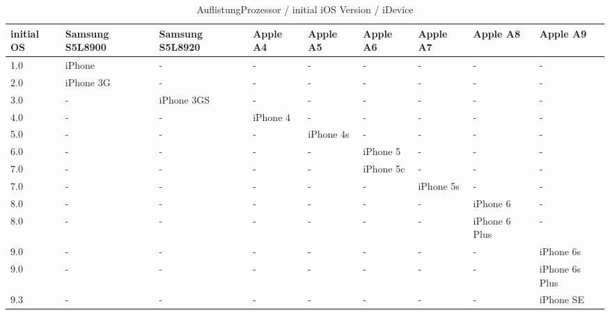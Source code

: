 \begin{table}[htp!]
    \begin{center}
        \begin{tabular}{| p{8mm} | p{18mm} | p{18mm} | p{15mm} | p{15mm} | p{15mm} | p{15mm} | p{15mm} | p{15mm} |} \hline
\textbf{initial OS} & \textbf{Samsung S5L8900} & \textbf{Samsung S5L8920} & \textbf{Apple A4}	& \textbf{Apple A5}	& \textbf{Apple A6} & \textbf{Apple A7} & \textbf{Apple A8} & \textbf{Apple A9} \\ \hline
1.0 & iPhone & - & - &  - &  - & - &  - & - \\ \hline		
2.0 & iPhone 3G & - & - &  - &  - & - &  - & - \\ \hline				
3.0 & - & iPhone 3GS & - &  - &  - & - &  - & -	\\ \hline			
4.0 & - &  - & iPhone 4	 &  - &  - & - &  - & -	\\ \hline		
5.0 &  - & - &  - &	iPhone 4s &  - & - &  - & - \\ \hline		
6.0 &  - &  - & - &  - & iPhone 5 & - &  - & -	\\ \hline	
7.0 &  - &  - & - &  - & iPhone 5c	& - &  - & - \\ \hline	
7.0 & - &  - &  - & - &  - & iPhone 5s &  - & - \\ \hline
8.0 & - & - &  - &  - & - &  - & iPhone 6 & - \\ \hline
8.0 & - & - &  - &  - & - &  - & iPhone 6 Plus & -\\ \hline
9.0 & - & - &  - &  - & - &  - & - & iPhone 6s \\ \hline
9.0 & - & - &  - &  - & - &  - & - & iPhone 6s Plus \\ \hline
9.3 & - & - &  - &  - & - &  - & - & iPhone SE \\ \hline     
        \end{tabular} 
        \caption{AuflistungProzessor / initial iOS Version / iDevice \protect\footnotemark}
        \label{tab:AuflistungProziOSVersioniDevice}
    \end{center}
\end{table}
\newpage
